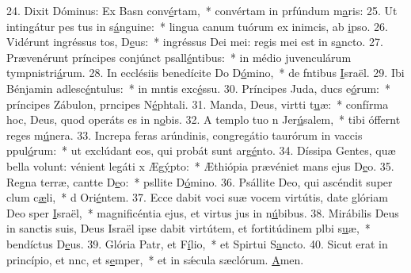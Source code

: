 24. Dixit Dóminus: Ex Basn conv\uline{é}rtam,~* convértam in prfúndum m\uline{a}ris:
25. Ut intingátur pes tus in s\uline{á}nguine:~* lingua canum tuórum ex inimcis, ab \uline{i}pso.
26. Vidérunt ingréssus tos, D\uline{e}us:~* ingréssus Dei mei: regis mei  est in s\uline{a}ncto.
27. Prævenérunt príncipes conjúnct psall\uline{é}ntibus:~* in médio juvenculárum tympnistri\uline{á}rum.
28. In ecclésiis benedícite Do D\uline{ó}mino,~* de fntibus \uline{I}sraël.
29. Ibi Bénjamin adlesc\uline{é}ntulus:~* in mntis exc\uline{é}ssu.
30. Príncipes Juda, ducs e\uline{ó}rum:~* príncipes Zábulon, prncipes N\uline{é}phtali.
31. Manda, Deus, virtti t\uline{u}æ:~* confírma hoc, Deus, quod operáts es in n\uline{o}bis.
32. A templo tuo n Jer\uline{ú}salem,~* tibi óffernt reges m\uline{ú}nera.
33. Increpa feras arúndinis, congregátio taurórum in vaccis ppul\uline{ó}rum:~* ut exclúdant eos, qui probát sunt arg\uline{é}nto.
34. Díssipa Gentes, quæ bella volunt: vénient legáti x Æg\uline{ý}pto:~* Æthiópia prævéniet mans ejus D\uline{e}o.
35. Regna terræ, cantte D\uline{e}o:~* psllite D\uline{ó}mino.
36. Psállite Deo, qui ascéndit super clum c\uline{æ}li,~* d Ori\uline{é}ntem.
37. Ecce dabit voci suæ vocem virtútis, date glóriam Deo sper \uline{I}sraël,~* magnificéntia ejus, et virtus jus in n\uline{ú}bibus.
38. Mirábilis Deus in sanctis suis, Deus Israël ipse dabit virtútem, et fortitúdinem plbi s\uline{u}æ,~* bendíctus D\uline{e}us.
39. Glória Patr, et F\uline{í}lio,~* et Spirtui S\uline{a}ncto.
40. Sicut erat in princípio, et nnc, et s\uline{e}mper,~* et in sǽcula sæclórum. \uline{A}men.

